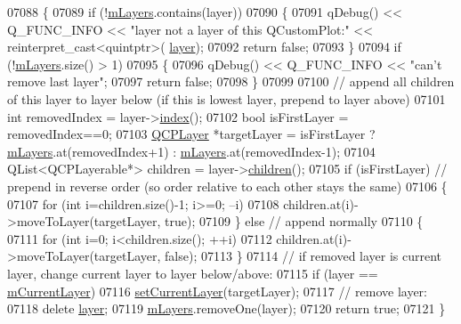\begin{DoxyCode}
07088 \{
07089   \textcolor{keywordflow}{if} (!\hyperlink{a00116_ae46b0ffefe1087007ffb11398a18a20e}{mLayers}.contains(layer))
07090   \{
07091     qDebug() << Q\_FUNC\_INFO << \textcolor{stringliteral}{"layer not a layer of this QCustomPlot:"} << \textcolor{keyword}{reinterpret\_cast<}quintptr\textcolor{keyword}{>}(
      \hyperlink{a00116_ae576ada60c1133318e29348d43d3cf10}{layer});
07092     \textcolor{keywordflow}{return} \textcolor{keyword}{false};
07093   \}
07094   \textcolor{keywordflow}{if} (!\hyperlink{a00116_ae46b0ffefe1087007ffb11398a18a20e}{mLayers}.size() > 1)
07095   \{
07096     qDebug() << Q\_FUNC\_INFO << \textcolor{stringliteral}{"can't remove last layer"};
07097     \textcolor{keywordflow}{return} \textcolor{keyword}{false};
07098   \}
07099   
07100   \textcolor{comment}{// append all children of this layer to layer below (if this is lowest layer, prepend to layer above)}
07101   \textcolor{keywordtype}{int} removedIndex = layer->\hyperlink{a00043_ad5d7010829a6b99f326b07d7e37c8c99}{index}();
07102   \textcolor{keywordtype}{bool} isFirstLayer = removedIndex==0;
07103   \hyperlink{a00043}{QCPLayer} *targetLayer = isFirstLayer ? \hyperlink{a00116_ae46b0ffefe1087007ffb11398a18a20e}{mLayers}.at(removedIndex+1) : 
      \hyperlink{a00116_ae46b0ffefe1087007ffb11398a18a20e}{mLayers}.at(removedIndex-1);
07104   QList<QCPLayerable*> children = layer->\hyperlink{a00043_a94c2f0100e48cefad2de8fe0fbb03c27}{children}();
07105   \textcolor{keywordflow}{if} (isFirstLayer) \textcolor{comment}{// prepend in reverse order (so order relative to each other stays the same)}
07106   \{
07107     \textcolor{keywordflow}{for} (\textcolor{keywordtype}{int} i=children.size()-1; i>=0; --i)
07108       children.at(i)->moveToLayer(targetLayer, \textcolor{keyword}{true});
07109   \} \textcolor{keywordflow}{else}  \textcolor{comment}{// append normally}
07110   \{
07111     \textcolor{keywordflow}{for} (\textcolor{keywordtype}{int} i=0; i<children.size(); ++i)
07112       children.at(i)->moveToLayer(targetLayer, \textcolor{keyword}{false});
07113   \}
07114   \textcolor{comment}{// if removed layer is current layer, change current layer to layer below/above:}
07115   \textcolor{keywordflow}{if} (layer == \hyperlink{a00116_ae9821179b860bf04af25882e881e5e09}{mCurrentLayer})
07116     \hyperlink{a00116_a73a6dc47c653bb6f8f030abca5a11852}{setCurrentLayer}(targetLayer);
07117   \textcolor{comment}{// remove layer:}
07118   \textcolor{keyword}{delete} \hyperlink{a00116_ae576ada60c1133318e29348d43d3cf10}{layer};
07119   \hyperlink{a00116_ae46b0ffefe1087007ffb11398a18a20e}{mLayers}.removeOne(layer);
07120   \textcolor{keywordflow}{return} \textcolor{keyword}{true};
07121 \}
\end{DoxyCode}


